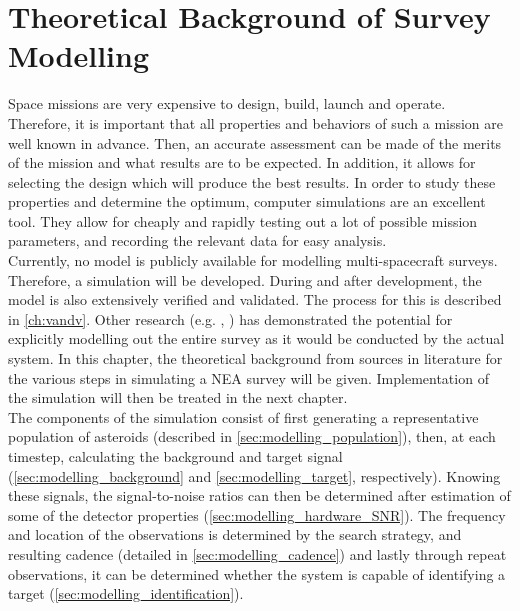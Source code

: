 \chapter{Theoretical Background of Survey Modelling}
\label{ch:surveymodelling}

Space missions are very expensive to design, build, launch and operate. Therefore, it is important that all properties and behaviors of such a mission are well known in advance. Then, an accurate assessment can be made of the merits of the mission and what results are to be expected. In addition, it allows for selecting the design which will produce the best results. In order to study these properties and determine the optimum, computer simulations are an excellent tool. They allow for cheaply and rapidly testing out a lot of possible mission parameters, and recording the relevant data for easy analysis. \\

Currently, no model is publicly available for modelling multi-spacecraft surveys. Therefore, a simulation will be developed. During and after development, the model is also extensively verified and validated. The process for this is described in \autoref{ch:vandv}. Other research (e.g. \cite{Flyeye}, \cite{2017NEOSDT}) has demonstrated the potential for explicitly modelling out the entire survey as it would be conducted by the actual system. In this chapter, the theoretical background from sources in literature for the various steps in simulating a NEA survey will be given. Implementation of the simulation will then be treated in the next chapter.\\

The components of the simulation consist of first generating a representative population of asteroids (described in \autoref{sec:modelling_population}), then, at each timestep, calculating the background and target signal (\autoref{sec:modelling_background} and \autoref{sec:modelling_target}, respectively). Knowing these signals, the signal-to-noise ratios can then be determined after estimation of some of the detector properties (\autoref{sec:modelling_hardware_SNR}). The frequency and location of the observations is determined by the search strategy, and resulting cadence (detailed in \autoref{sec:modelling_cadence}) and lastly through repeat observations, it can be determined whether the system is capable of identifying a target (\autoref{sec:modelling_identification}).\\

